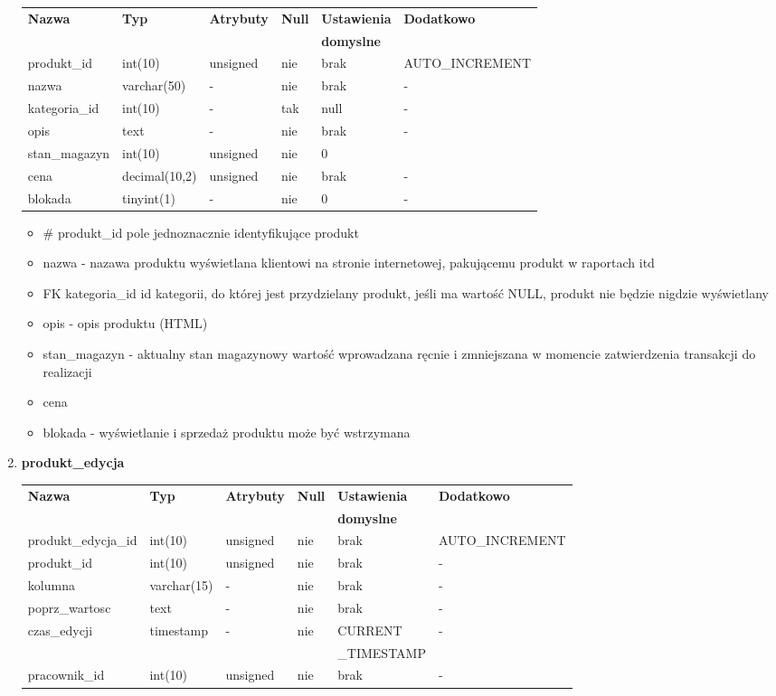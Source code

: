 \begin{enumerate}
\begin{tabular}{|l|l|l|l|l|l|} \hline
	\textbf{Nazwa} & \textbf{Typ} & \textbf{Atrybuty} & \textbf{Null} & \textbf{Ustawienia} & \textbf{Dodatkowo} \\
	&&&&\textbf{domyslne}&\\
	\hline
	produkt\_id&int(10)&unsigned&nie&brak&AUTO\_INCREMENT \\
	nazwa&varchar(50)&-&nie&brak&-\\
	kategoria\_id&int(10)&-&tak&null&-\\
	opis&text&-&nie&brak&-\\
	stan\_magazyn&int(10)&unsigned&nie&0 \\
	cena&decimal(10,2)&unsigned&nie&brak&-\\
	blokada&tinyint(1)&-&nie&0&-\\
	\hline
	
\end{tabular}
\begin{itemize}
	\item \# produkt\_id pole jednoznacznie identyfikujące produkt
	\item nazwa - nazawa produktu wyświetlana klientowi na stronie internetowej, pakującemu produkt w raportach itd
	\item FK kategoria\_id id kategorii, do której jest przydzielany produkt, jeśli ma wartość NULL, produkt nie będzie nigdzie wyświetlany
	\item opis - opis produktu (HTML)
	\item stan\_magazyn - aktualny stan magazynowy wartość wprowadzana ręcnie i zmniejszana w momencie zatwierdzenia transakcji do realizacji
	\item cena
	\item blokada - wyświetlanie i sprzedaż produktu może być wstrzymana
	\end{itemize} 

\item \textbf{produkt\_edycja}

\begin{tabular}{|l|l|l|l|l|l|} \hline
	\textbf{Nazwa} & \textbf{Typ} & \textbf{Atrybuty} & \textbf{Null} & \textbf{Ustawienia} & \textbf{Dodatkowo} \\
	&&&&\textbf{domyslne}&\\
	\hline
	produkt\_edycja\_id&int(10)&unsigned&nie&brak&AUTO\_INCREMENT \\
	produkt\_id&int(10)&unsigned&nie&brak&-\\
	kolumna&varchar(15)&-&nie&brak&-\\
	poprz\_wartosc&text&-&nie&brak&-\\
	czas\_edycji&timestamp&-&nie&CURRENT&-\\
	&&&&\_TIMESTAMP&\\
	pracownik\_id&int(10)&unsigned&nie&brak&-\\
	\hline
	

\end{tabular}
\end{enumerate}
